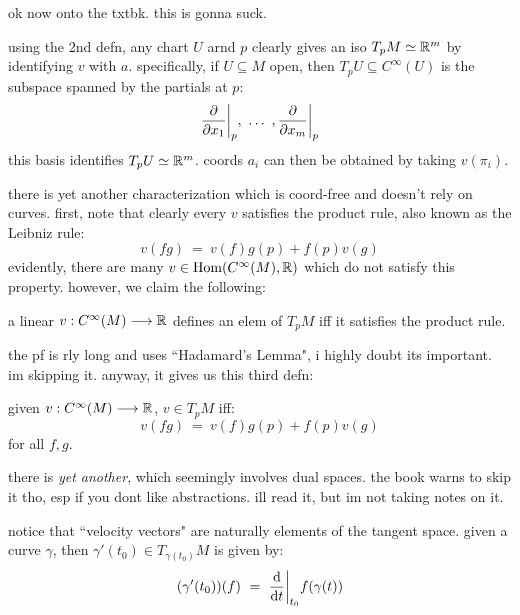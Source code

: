 ok now onto the txtbk. this is gonna suck.

using the 2nd defn, any chart $U$ arnd $p$ clearly gives an iso $T_{p}M\simeq\mathbb{R}^{m}$
by identifying $v$ with $a$.
specifically, if $U\subseteq M$ open, then $T_{p}U\subseteq C^{\infty}(U)$ is
the subspace spanned by the partials at $p$:
\begin{equation*}
	\frac{\partial}{\partial x_{1}}\bigg\rvert_{p}, \ \dots \ , \frac{\partial}{\partial x_{m}}\bigg\rvert_{p}
\end{equation*}
this basis identifies $T_{p}U\simeq\mathbb{R}^{m}$.
coords $a_{i}$ can then be obtained by taking $v(\pi_{i})$.

there is yet another characterization which is coord-free and doesn't rely on curves.
first, note that clearly every $v$ satisfies the product rule, also known as
the Leibniz rule:
\begin{equation*}
	v(fg) \ = \ v(f)g(p) + f(p)v(g)
\end{equation*}
evidently, there are many $v\in\operatorname{Hom}(C^{\infty}(M),\mathbb{R})$ which do not satisfy
this property. however, we claim the following:
\begin{thm}
	a linear $v:C^{\infty}(M)\longrightarrow\mathbb{R}$ defines an elem of $T_{p}M$ iff it
	satisfies the product rule.
\end{thm}
the pf is rly long and uses ``Hadamard's Lemma", i highly doubt its important.
im skipping it. anyway, it gives us this third defn:

\begin{defn}
	given $v:C^{\infty}(M)\longrightarrow\mathbb{R}$, $v\in T_{p}M$ iff:
	\begin{equation*}
		v(fg) \ = \ v(f)g(p) + f(p)v(g)
	\end{equation*}
	for all $f,g$.
\end{defn}
there is \textit{yet another}, which seemingly involves dual spaces.
the book warns to skip it tho, esp if you dont like abstractions.
ill read it, but im not taking notes on it.

notice that ``velocity vectors" are naturally elements of the tangent space.
given a curve $\gamma$, then $\gamma'(t_{0})\in T_{\gamma(t_{0})}M$ is given by:
\begin{equation*}
	(\gamma'(t_{0}))(f) \ = \ \frac{\d}{\d t}\bigg\rvert_{t_{0}}f(\gamma(t))
\end{equation*}
